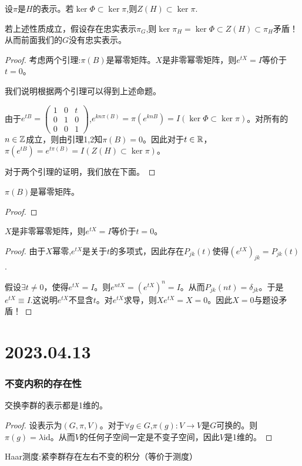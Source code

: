 \begin{proposition}
    设$\pi$是$H$的表示。若$\ker \Phi \subset \ker \pi$,则$Z(H)\subset \ker \pi$.
\end{proposition}
若上述性质成立，假设存在忠实表示$\pi_G$,则$\ker \pi_H=\ker \Phi \subset Z(H) \subset \pi_H$矛盾！从而前面我们的$G$没有忠实表示。

\begin{proof}
    考虑两个引理:$\pi(B)$是幂零矩阵。$X$是非零幂零矩阵，则$e^{tX}=I$等价于$t=0$。

    我们说明根据两个引理可以得到上述命题。

    由于$e^{tB}=\begin{pmatrix}
        1&0&t\\0&1&0\\0&0&1
    \end{pmatrix}$,$e^{kn\pi(B)}=\pi(e^{knB})=I(\ker \Phi \subset \ker \pi)$。对所有的$n \in \mathbb{Z}$成立，则由引理1,2知$\pi(B)=0$。因此对于$t \in \mathbb{R}$，$\pi(e^{tB})=e^{t\pi(B)}=I(Z(H)\subset \ker \pi)$。

    对于两个引理的证明，我们放在下面。
\end{proof}
\begin{lemma}
    $\pi(B)$是幂零矩阵。
\end{lemma}
\begin{proof}
    
\end{proof}
\begin{lemma}
    $X$是非零幂零矩阵，则$e^{tX}=I$等价于$t=0$。
\end{lemma}
\begin{proof}
    由于$X$幂零,$e^{tX}$是关于$t$的多项式，因此存在$P_{jk}(t)$使得$(e^{tX})
    _{jk}=P_{jk}(t)$.

    假设$\exists t \neq 0$，使得$e^{tX}=I$。则$e^{ntX}=(e^{tX})^n=I$。从而$P_{jk}(nt)=\delta_{jk}$。于是$e^{tX}\equiv I$.这说明$e^{tX}$不显含$t$。对$e^{tX}$求导，则$Xe^{tX}=X=0$。因此$X=0$与题设矛盾！
\end{proof}
\chapter{2023.04.13}
\subsection{不变内积的存在性}
\begin{theorem}
    交换李群的表示都是1维的。
\end{theorem}
\begin{proof}
    设表示为$(G,\pi,V)$。对于$\forall g \in G$,$\pi(g): V \to V$是$G$可换的。则$\pi(g)=\lambda \mathrm{id}$。从而$V$的任何子空间一定是不变子空间，因此$V$是1维的。
\end{proof}
Haar测度:紧李群存在左右不变的积分（等价于测度）

